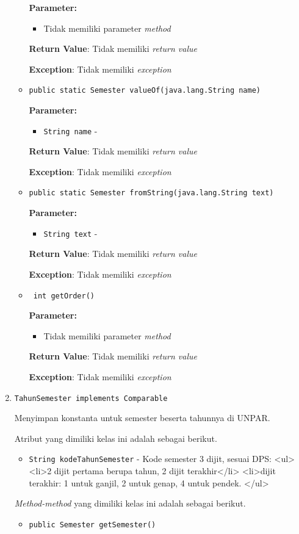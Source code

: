 \documentclass{article}
\begin{document}
\begin{enumerate}
\begin{itemize}
\textbf{Parameter:}
\begin{itemize}
\item Tidak memiliki parameter \textit{method}
\end{itemize}
\textbf{Return Value}: Tidak memiliki \textit{return value}

\textbf{Exception}: Tidak memiliki \textit{exception}

\item \texttt{public static Semester valueOf(java.lang.String name)}



\textbf{Parameter:}
\begin{itemize}
\item \texttt{String name} - 
\end{itemize}
\textbf{Return Value}: Tidak memiliki \textit{return value}

\textbf{Exception}: Tidak memiliki \textit{exception}

\item \texttt{public static Semester fromString(java.lang.String text)}



\textbf{Parameter:}
\begin{itemize}
\item \texttt{String text} - 
\end{itemize}
\textbf{Return Value}: Tidak memiliki \textit{return value}

\textbf{Exception}: Tidak memiliki \textit{exception}

\item \texttt{ int getOrder()}



\textbf{Parameter:}
\begin{itemize}
\item Tidak memiliki parameter \textit{method}
\end{itemize}
\textbf{Return Value}: Tidak memiliki \textit{return value}

\textbf{Exception}: Tidak memiliki \textit{exception}

\end{itemize}
\item \texttt{TahunSemester implements Comparable}

Menyimpan konstanta untuk semester beserta tahunnya di UNPAR.

Atribut yang dimiliki kelas ini adalah sebagai berikut.
\begin{itemize}
\item \texttt{String kodeTahunSemester} - Kode semester 3 dijit, sesuai DPS:
 <ul>
   <li>2 dijit pertama berupa tahun, 2 dijit terakhir</li>
   <li>dijit terakhir: 1 untuk ganjil, 2 untuk genap, 4 untuk pendek.
 </ul>
\end{itemize}
\textit{Method-method} yang dimiliki kelas ini adalah sebagai berikut.
\begin{itemize}
\item \texttt{public Semester getSemester()}




\end{itemize}
\end{enumerate}
\end{document}
